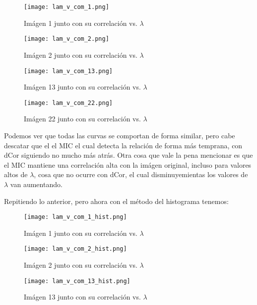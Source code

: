     \begin{figure}[H]
        \centering
        \texttt{[image: lam\_v\_com\_1.png]}
        \caption{Im\'agen 1 junto con su correlaci\'on vs. $\lambda$}
    \end{figure}

    \begin{figure}[H]
        \centering
        \texttt{[image: lam\_v\_com\_2.png]}
        \caption{Im\'agen 2 junto con su correlaci\'on vs. $\lambda$}
    \end{figure}

    \begin{figure}[H]
        \centering
        \texttt{[image: lam\_v\_com\_13.png]}
        \caption{Im\'agen 13 junto con su correlaci\'on vs. $\lambda$}
    \end{figure}

    \begin{figure}[H]
        \centering
        \texttt{[image: lam\_v\_com\_22.png]}
        \caption{Im\'agen 22 junto con su correlaci\'on vs. $\lambda$}
    \end{figure}

    Podemos ver que todas las curvas se comportan de forma similar, pero cabe descatar que el el MIC el cual detecta la relaci\'on de forma m\'as temprana, con dCor siguiendo no mucho m\'as atr\'as. Otra cosa que vale la pena mencionar es que el MIC mantiene una correlaci\'on alta con la im\'agen original, incluso para valores altos de $\lambda$, cosa que no ocurre con dCor, el cual disminuyemientas los valores de $\lambda$ van aumentando.

    Repitiendo lo anterior, pero ahora con el m\'etodo del histograma tenemos: 

    \begin{figure}[H]
        \centering
        \texttt{[image: lam\_v\_com\_1\_hist.png]}
        \caption{Im\'agen 1 junto con su correlaci\'on vs. $\lambda$}
    \end{figure}

    \begin{figure}[H]
        \centering
        \texttt{[image: lam\_v\_com\_2\_hist.png]}
        \caption{Im\'agen 2 junto con su correlaci\'on vs. $\lambda$}
    \end{figure}

    \begin{figure}[H]
        \centering
        \texttt{[image: lam\_v\_com\_13\_hist.png]}
        \caption{Im\'agen 13 junto con su correlaci\'on vs. $\lambda$}
    \end{figure}


